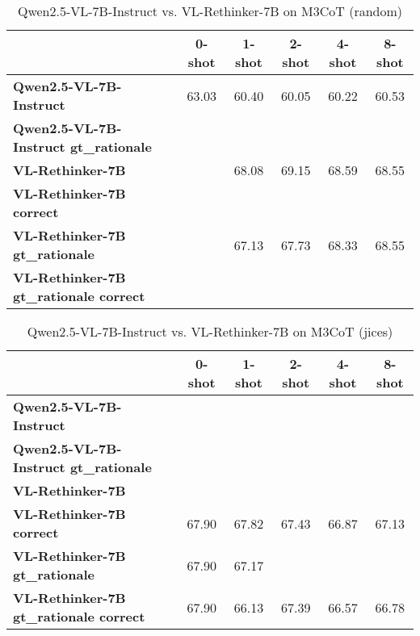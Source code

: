 \begin{table}
\caption{Qwen2.5-VL-7B-Instruct vs. VL-Rethinker-7B on M3CoT (random)}
\label{tab:Qwen2.5-VL-7B-Instruct_M3CoT_TRAIN_random}
\begin{tabular}{lccccc}
\toprule
 & 0-shot & 1-shot & 2-shot & 4-shot & 8-shot \\
\midrule
\textbf{Qwen2.5-VL-7B-Instruct} & 63.03 & 60.40 & 60.05 & 60.22 & 60.53 \\
\textbf{Qwen2.5-VL-7B-Instruct gt\_rationale} &  &  &  &  &  \\
\textbf{VL-Rethinker-7B} &  & 68.08 & 69.15 & 68.59 & 68.55 \\
\textbf{VL-Rethinker-7B correct} &  &  &  &  &  \\
\textbf{VL-Rethinker-7B gt\_rationale} &  & 67.13 & 67.73 & 68.33 & 68.55 \\
\textbf{VL-Rethinker-7B gt\_rationale correct} &  &  &  &  &  \\
\bottomrule
\end{tabular}
\end{table}


\begin{table}
\caption{Qwen2.5-VL-7B-Instruct vs. VL-Rethinker-7B on M3CoT (jices)}
\label{tab:Qwen2.5-VL-7B-Instruct_M3CoT_TRAIN_jices}
\begin{tabular}{lccccc}
\toprule
 & 0-shot & 1-shot & 2-shot & 4-shot & 8-shot \\
\midrule
\textbf{Qwen2.5-VL-7B-Instruct} &  &  &  &  &  \\
\textbf{Qwen2.5-VL-7B-Instruct gt\_rationale} &  &  &  &  &  \\
\textbf{VL-Rethinker-7B} &  &  &  &  &  \\
\textbf{VL-Rethinker-7B correct} & 67.90 & 67.82 & 67.43 & 66.87 & 67.13 \\
\textbf{VL-Rethinker-7B gt\_rationale} & 67.90 & 67.17 &  &  &  \\
\textbf{VL-Rethinker-7B gt\_rationale correct} & 67.90 & 66.13 & 67.39 & 66.57 & 66.78 \\
\bottomrule
\end{tabular}
\end{table}


